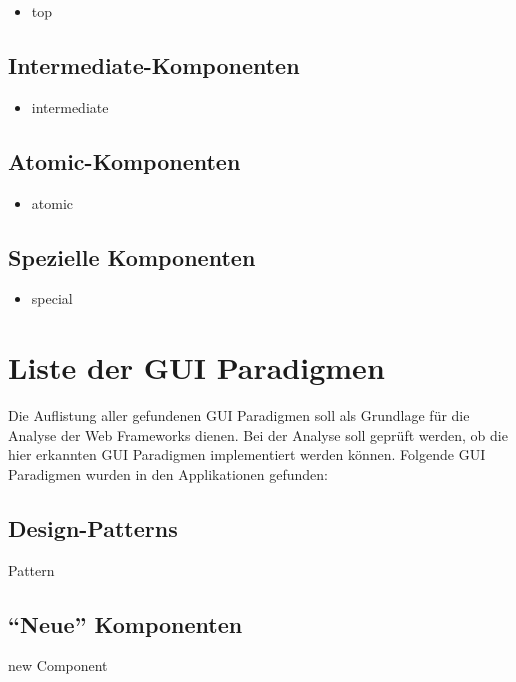   \begin{itemize}
    \item top
  \end{itemize}
  
  \subsection{Intermediate-Komponenten}
  
  \begin{itemize}
    \item intermediate
  \end{itemize}
  
  \subsection{Atomic-Komponenten}
  
  \begin{itemize}
    \item atomic
  \end{itemize}
  
  \subsection{Spezielle Komponenten}
  
  \begin{itemize}
    \item special
  \end{itemize}
  
  \section{Liste der GUI Paradigmen}
  
  Die Auflistung aller gefundenen GUI Paradigmen soll als Grundlage für die
  Analyse der Web Frameworks dienen. Bei der Analyse soll geprüft werden, ob
  die hier erkannten GUI Paradigmen implementiert werden können. Folgende GUI
  Paradigmen wurden in den Applikationen gefunden:
      
  \subsection{Design-Patterns}
  
  \begin{description}
    \item[Pattern]
  \end{description}
  
  \subsection{``Neue'' Komponenten}
  
  \begin{description}
    \item[new Component]
  \end{description}